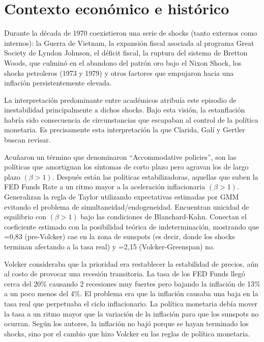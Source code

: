 \documentclass[12pt]{article}
\begin{document}
\section{Contexto económico e histórico}
\indent Durante la década de 1970 coexistieron una serie de shocks (tanto externos como internos): la Guerra de Vietnam, la expansión fiscal asociada al programa Great Society de Lyndon Johnson, el déficit fiscal, la ruptura del sistema de Bretton Woods, que culminó en el abandono del patrón oro bajo el Nixon Shock, los shocks petroleros (1973 y 1979) y otros factores que empujaron hacia una inflación persistentemente elevada.

\indent La interpretación predominante entre académicos atribuía este episodio de inestabilidad principalmente a dichos shocks. Bajo esta visión, la estanflación habría sido consecuencia de circunstancias que escapaban al control de la política monetaria. Es precisamente esta interpretación la que Clarida, Galí y Gertler buscan revisar.

\indent Acuñaron un término que denominaron “Accommodative policies”, son las políticas que amortiguan los síntomas de corto plazo pero agravan los de largo plazo $(\beta>1)$. Después están las políticas estabilizadoras, aquellas que suben la FED Funds Rate a un ritmo mayor a la aceleración inflacionaria $(\beta>1)$. Generalizan la regla de Taylor utilizando expectativas estimadas por GMM evitando el problema de simultaneidad/endogeneidad. Encuentran unicidad de equilibrio con $(\beta>1)$ bajo las condiciones de Blanchard-Kahn. Conectan el coeficiente estimado con la posibilidad teórica de indeterminación, mostrando que =0,83 (pre-Volcker) cae en la zona de sunspots (es decir, donde los shocks terminan afectando a la tasa real) y =2,15 (Volcker-Greenspan) no.
\vspace{1em}

\indent Volcker consideraba que la prioridad era restablecer la estabilidad de precios, aún al costo de provocar una recesión transitoria. La tasa de los FED Funds llegó cerca del 20\% causando 2 recesiones muy fuertes pero bajando la inflación de 13\% a un poco menos del 4\%. El problema era que la inflación causaba una baja en la tasa real que perpetuaba el ciclo inflacionario. La política monetaria debía mover la tasa a un ritmo mayor que la variación de la inflación para que los sunspots no ocurran. Según los autores, la inflación no bajó porque se hayan terminado los shocks, sino por el cambio que hizo Volcker en las reglas de política monetaria.
\end{document}
